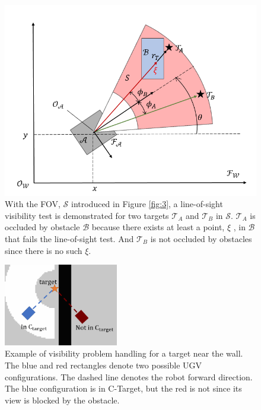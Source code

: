 \documentclass[12pt,draftcls,onecolumn]{IEEEtran}
\begin{document}
\begin{figure}
 \centering
  \includegraphics[width=12cm]{figures/lineSight}
  \caption{With the FOV, $\mathcal{S}$ introduced in Figure \ref{fig:3}, a line-of-sight visibility test is demonstrated for two targets  $\mathcal{T}_{A}$  and $\mathcal{T}_{B}$ in $\mathcal{S}$.  $\mathcal{T}_{A}$  is occluded by obstacle  $\mathcal{B}$  because there exists at least a point,  $\xi$ ,  in  $\mathcal{B}$ that fails the line-of-sight test. And $\mathcal{T}_{B}$ is not occluded by obstacles since there is no such $\xi$.}
  \label{fig:5}
\end{figure}

\begin{figure}
 \centering
  \includegraphics[width=5cm]{figures/visibility_eg}
  \caption{Example of visibility problem handling for a target near the wall. The blue and red rectangles denote two possible UGV configurations. The dashed line denotes the robot forward direction. The blue configuration is in C-Target, but the red is not since its view is blocked by the obstacle.}
  \label{fig:7}
\end{figure}






\end{document}
